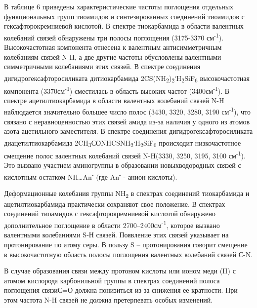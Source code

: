\begin{multicols}{2}
В таблице 6 приведены характеристические частоты поглощения отдельных
функциональных групп тиоамидов и синтезированных соединений тиоамидов с
гексафторокремниевой кислотой. В спектре тиокарбамида в области
валентных колебаний связей обнаружены три полосы поглощения (3175-3370
см\textsuperscript{-1}). Высокочастотная компонента отнесена к валентным
антисимметричным колебаниям связей N-H, а две другие частоты обусловлены
валентными симметричными колебаниями этих связей. В спектре соединения
дигидрогексафторосиликата дитиокарбамида
2CS(NH\textsubscript{2})\textsubscript{2}{\bfseries \textsuperscript{.}}H\textsubscript{2}SiF\textsubscript{6}
высокочастотная компонента (3370см\textsuperscript{-1}) сместилась в
область высоких частот (3400см\textsuperscript{-1}). В спектре
ацетилтиокарбамида в области валентных колебаний связей N-H наблюдается
значительно большее число полос (3430, 3320, 3280, 3190
см\textsuperscript{-1}), что связано с неравноценностью этих связей
амида из-за наличия у одного из атомов азота ацетильного заместителя. В
спектре соединения дигидрогексафторосиликата диацетилтиокарбамида
2CH\textsubscript{3}СОNHCSNH\textsubscript{2}{\bfseries \textsuperscript{.}}H\textsubscript{2}SiF\textsubscript{6}
происходит низкочастотное смещение полос валентных колебаний связей
N-H(3330, 3250, 3195, 3100 см\textsuperscript{-1}). Это вызвано участием
аминогруппы в образовании новыхводородных связей с кислотным остатком
NH\ldots An\textsuperscript{-} (где An\textsuperscript{-} - анион
кислоты).

Деформационные колебания группы NH\textsubscript{2} в спектрах
соединений тиокарбамида и ацетилтиокарбамида практически сохраняют свое
положение. В спектрах соединений тиоамидов с гексафторокремниевой
кислотой обнаружено дополнительное поглощение в области
2700--2400см\textsuperscript{-1}, которое вызвано валентными колебаниями
S-Н связей. Появление этих связей указывает на протонирование по атому
серы. В пользу S -- протонирования говорит смещение в высокочастотную
область полосы поглощения валентных колебаний связей С-N.

В случае образования связи между протоном кислоты или ионом меди (II) с
атомом кислорода карбонильной группы в спектрах соединений полоса
поглощения связиС=О должна понизиться из-за снижения ее кратности. При
этом частота N-H связей не должна претерпевать особых изменений.


\end{multicols}
